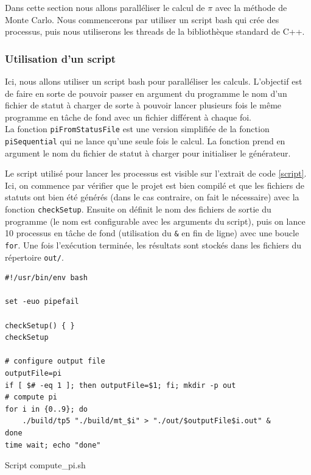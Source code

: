 \documentclass[a4paper]{article}
\begin{document}
Dans cette section nous allons paralléliser le calcul de $\pi$ avec la méthode
de Monte Carlo. Nous commencerons par utiliser un script bash qui crée des
processus, puis nous utiliserons les threads de la bibliothèque standard de C++.

\subsubsection{Utilisation d'un script}
\label{sec:script}

Ici, nous allons utiliser un script bash pour paralléliser les calculs.
L'objectif est de faire en sorte de pouvoir passer en argument du programme le
nom d'un fichier de statut à charger de sorte à pouvoir lancer plusieurs fois le
même programme en tâche de fond avec un fichier différent à chaque foi.\\

La fonction \texttt{piFromStatusFile} est une version simplifiée de la fonction
\texttt{piSequential} qui ne lance qu'une seule fois le calcul. La fonction
prend en argument le nom du fichier de statut à charger pour initialiser le
générateur.

Le script utilisé pour lancer les processus est visible sur l'extrait de code
\ref{script}. Ici, on commence par vérifier que le projet est bien compilé et
que les fichiers de statuts ont bien été générés (dans le cas contraire, on fait
le nécessaire) avec la fonction \texttt{checkSetup}. Ensuite on définit le nom
des fichiers de sortie du programme (le nom est configurable avec les arguments
du script), puis on lance 10 processus en tâche de fond (utilisation du
\texttt{\&} en fin de ligne) avec une boucle \texttt{for}. Une fois l'exécution
terminée, les résultats sont stockés dans les fichiers du répertoire
\texttt{out/}.

\begin{listing}[ht!]
\begin{verbatim}
#!/usr/bin/env bash

set -euo pipefail

checkSetup() { }
checkSetup

# configure output file
outputFile=pi
if [ $# -eq 1 ]; then outputFile=$1; fi; mkdir -p out
# compute pi
for i in {0..9}; do
    ./build/tp5 "./build/mt_$i" > "./out/$outputFile$i.out" &
done
time wait; echo "done"
\end{verbatim}
\caption{Script compute\_pi.sh}
\label{script}
\end{listing}
\end{document}
